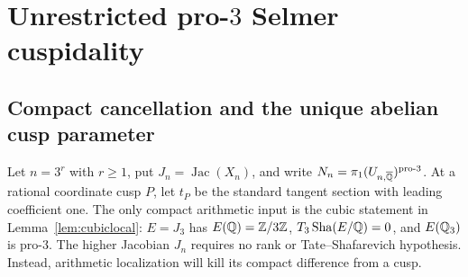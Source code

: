 \section{Unrestricted pro-\texorpdfstring{$3$}{3} Selmer cuspidality}
\subsection{Compact cancellation and the unique abelian cusp parameter}
\label{subsec:lm-unrestricted-reduction}

Let $n=3^r$ with $r\ge1$, put $J_n=\operatorname{Jac}(X_n)$, and write
$N_n=\pi_1(U_{n,\overline{\mathbb Q}})^{\mathrm{pro}\text{-}3}$.
At a rational coordinate cusp $P$, let $t_P$ be the standard tangent
section with leading coefficient one.  The only compact arithmetic
input is the cubic statement in Lemma~\ref{lem:cubiclocal}:
$E=J_3$ has $E(\mathbb Q)=\mathbb Z/3\mathbb Z$, $T_3\operatorname{Sha}(E/\mathbb Q)=0$, and
$E(\mathbb Q_3)$ is pro-$3$.  The higher Jacobian $J_n$ requires no rank
or Tate--Shafarevich hypothesis.  Instead, arithmetic localization
will kill its compact difference from a cusp.

